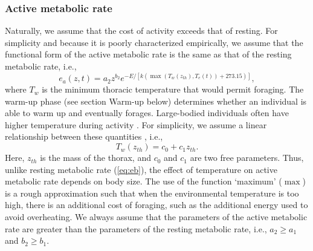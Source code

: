 \subsubsection*{Active metabolic rate}
Naturally, we assume that the cost of activity exceeds that of resting.  %
For simplicity and because it is poorly characterized empirically, we assume that the functional form of the active metabolic rate is the same as that of the resting metabolic rate, i.e., 
\begin{equation} \label{eq:ea}
	e_a(z,t) = a_2 z^{b_2}  e^{-E/[k (\max(T_w(z_{th}), T_e(t))+ 273.15)]},
\end{equation}
where $T_w$ is the minimum thoracic temperature that would permit foraging.
The warm-up phase (see section Warm-up below) determines whether an individual is able to warm up and eventually forages.
Large-bodied individuals often have higher temperature during activity \citep{Bartholomew1977a}. %
For simplicity, we assume a linear relationship between these quantities \citep{Bartholomew1977a}, i.e., %
\begin{equation} \label{eq:Tw}
	T_w(z_{th}) = c_0+ c_1 z_{th}.
\end{equation}
Here, $z_{th}$ is the mass of the thorax, and $c_0$ and $c_1$ are two free parameters.
Thus, unlike resting metabolic rate (\cref{eq:eb}), the effect of temperature on active metabolic rate depends on body size.
The use of the function `maximum' ($\max$) is a rough approximation such that when the environmental temperature is too high, there is an additional cost of foraging, such as the additional energy used to avoid overheating. 
We always assume that the parameters of the active metabolic rate are greater than the parameters of the resting metabolic rate, i.e., $a_2 \geq a_1$ and $b_2 \geq b_1$. %

